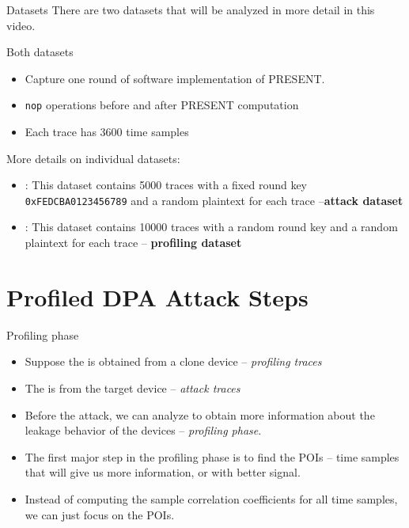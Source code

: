 \begin{frame}{Datasets}
There are two datasets that will be analyzed in more detail in this video.

Both datasets
\begin{itemize}
    \item Capture one round of software implementation of PRESENT.
    \item \texttt{nop} operations before and after PRESENT computation
    \item Each trace has $3600$ time samples
\end{itemize}
More details on individual datasets:
\begin{itemize}
    \item \dataranone: This dataset contains 5000 traces with a fixed round key \texttt{0xFEDCBA0123456789} and a random plaintext for each trace --\textbf{attack dataset}
    \item \datarantwo: This dataset contains 10000 traces with a random round key and a random plaintext for each trace -- \textbf{profiling dataset}
\end{itemize}
\end{frame}

\section{Profiled DPA Attack Steps}
\begin{frame}{\VideoName}
    \tableofcontents[currentsection]
\end{frame}

\begin{frame}{Profiling phase}
    \begin{itemize}
        \item Suppose the \datarantwo is obtained from a clone device -- \textit{profiling traces}
        \item The \dataranone is from the target device -- \textit{attack traces}
        \item Before the attack, we can analyze \datarantwo to obtain more information about the leakage behavior of the devices -- \textit{profiling phase}.
        \item The first major step in the profiling phase is to find the POIs -- time samples that will give us more information, or with better signal.
        \item Instead of computing the sample correlation coefficients for all time samples, we can just focus on the POIs.
    \end{itemize}
\end{frame}

